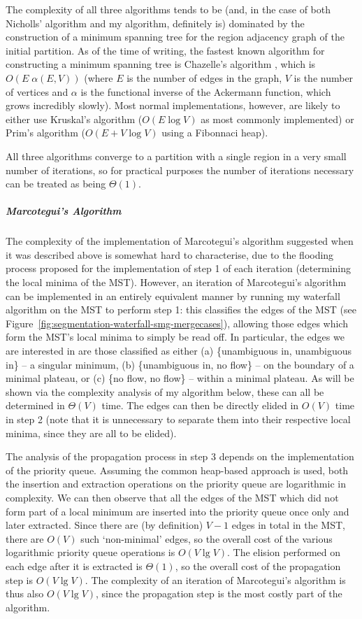 The complexity of all three algorithms tends to be (and, in the case of both Nicholls' algorithm and my algorithm, definitely is) dominated by the construction of a minimum spanning tree for the region adjacency graph of the initial partition. As of the time of writing, the fastest known algorithm for constructing a minimum spanning tree is Chazelle's algorithm \cite{chazelle00}, which is $O(E \; \alpha(E,V))$ (where $E$ is the number of edges in the graph, $V$ is the number of vertices and $\alpha$ is the functional inverse of the Ackermann function, which grows incredibly slowly). Most normal implementations, however, are likely to either use Kruskal's algorithm ($O(E \log V)$ as most commonly implemented) or Prim's algorithm ($O(E + V \log V)$ using a Fibonnaci heap).

All three algorithms converge to a partition with a single region in a very small number of iterations, so for practical purposes the number of iterations necessary can be treated as being $\Theta(1)$.

\subparagraph{Marcotegui's Algorithm}

The complexity of the implementation of Marcotegui's algorithm suggested when it was described above is somewhat hard to characterise, due to the flooding process proposed for the implementation of step 1 of each iteration (determining the local minima of the MST). However, an iteration of Marcotegui's algorithm can be implemented in an entirely equivalent manner by running my waterfall algorithm on the MST to perform step 1: this classifies the edges of the MST (see Figure~\ref{fig:segmentation-waterfall-smg-mergecases}), allowing those edges which form the MST's local minima to simply be read off. In particular, the edges we are interested in are those classified as either (a) \{unambiguous in, unambiguous in\} -- a singular minimum, (b) \{unambiguous in, no flow\} -- on the boundary of a minimal plateau, or (c) \{no flow, no flow\} -- within a minimal plateau. As will be shown via the complexity analysis of my algorithm below, these can all be determined in $\Theta(V)$ time. The edges can then be directly elided in $O(V)$ time in step 2 (note that it is unnecessary to separate them into their respective local minima, since they are all to be elided).

The analysis of the propagation process in step 3 depends on the implementation of the priority queue. Assuming the common heap-based approach \cite{clr-pq} is used, both the insertion and extraction operations on the priority queue are logarithmic in complexity. We can then observe that all the edges of the MST which did not form part of a local minimum are inserted into the priority queue once only and later extracted. Since there are (by definition) $V - 1$ edges in total in the MST, there are $O(V)$ such `non-minimal' edges, so the overall cost of the various logarithmic priority queue operations is $O(V \lg V)$. The elision performed on each edge after it is extracted is $\Theta(1)$, so the overall cost of the propagation step is $O(V \lg V)$. The complexity of an iteration of Marcotegui's algorithm is thus also $O(V \lg V)$, since the propagation step is the most costly part of the algorithm.

